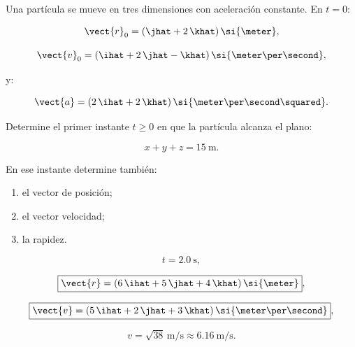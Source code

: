 \begin{ejercicio}
Una partícula se mueve en tres dimensiones con aceleración constante. En \(t=0\):

\[
\vect{r}_0
=
(\jhat+2\,\khat)\,\si{\meter},
\]

\[
\vect{v}_0
=
(\ihat+2\,\jhat-\khat)\,
\si{\meter\per\second},
\]

y:

\[
\vect{a}
=
(2\,\ihat+2\,\khat)\,
\si{\meter\per\second\squared}.
\]

Determine el primer instante \(t\geq0\) en que la partícula alcanza el plano:

\[
x+y+z=\SI{15}{\meter}.
\]

En ese instante determine también:

\begin{enumerate}[label=\alph*)]
    \item el vector de posición;
    \item el vector velocidad;
    \item la rapidez.
\end{enumerate}
\end{ejercicio}

\begin{respuesta}
\[
\boxed{t=\SI{2.0}{\second}},
\]

\[
\boxed{
\vect{r}
=
(6\,\ihat+5\,\jhat+4\,\khat)\,\si{\meter}
},
\]

\[
\boxed{
\vect{v}
=
(5\,\ihat+2\,\jhat+3\,\khat)\,
\si{\meter\per\second}
},
\]

\[
\boxed{
v=\sqrt{38}\,\si{\meter\per\second}
\approx
\SI{6.16}{\meter\per\second}
}.
\]
\end{respuesta}

